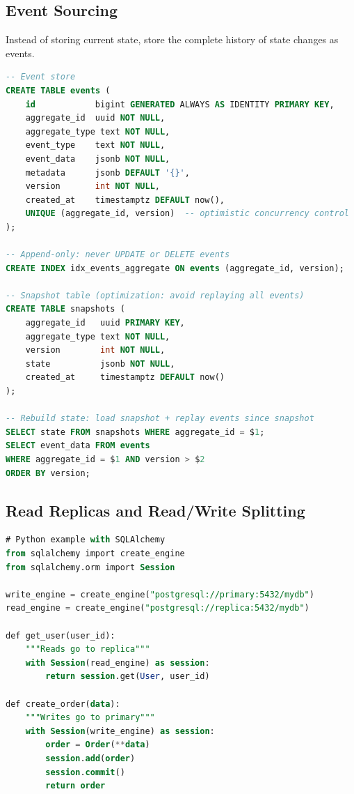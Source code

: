 \documentclass[12pt,a4paper]{article}
\begin{document}
\subsection{Event Sourcing}

Instead of storing current state, store the complete history of state changes as events.

\begin{lstlisting}[language=SQL, caption={Event sourcing in PostgreSQL}]
-- Event store
CREATE TABLE events (
    id            bigint GENERATED ALWAYS AS IDENTITY PRIMARY KEY,
    aggregate_id  uuid NOT NULL,
    aggregate_type text NOT NULL,
    event_type    text NOT NULL,
    event_data    jsonb NOT NULL,
    metadata      jsonb DEFAULT '{}',
    version       int NOT NULL,
    created_at    timestamptz DEFAULT now(),
    UNIQUE (aggregate_id, version)  -- optimistic concurrency control
);

-- Append-only: never UPDATE or DELETE events
CREATE INDEX idx_events_aggregate ON events (aggregate_id, version);

-- Snapshot table (optimization: avoid replaying all events)
CREATE TABLE snapshots (
    aggregate_id   uuid PRIMARY KEY,
    aggregate_type text NOT NULL,
    version        int NOT NULL,
    state          jsonb NOT NULL,
    created_at     timestamptz DEFAULT now()
);

-- Rebuild state: load snapshot + replay events since snapshot
SELECT state FROM snapshots WHERE aggregate_id = $1;
SELECT event_data FROM events
WHERE aggregate_id = $1 AND version > $2
ORDER BY version;
\end{lstlisting}

\subsection{Read Replicas and Read/Write Splitting}

\begin{lstlisting}[language=SQL, caption={Application-level read/write splitting}]
# Python example with SQLAlchemy
from sqlalchemy import create_engine
from sqlalchemy.orm import Session

write_engine = create_engine("postgresql://primary:5432/mydb")
read_engine = create_engine("postgresql://replica:5432/mydb")

def get_user(user_id):
    """Reads go to replica"""
    with Session(read_engine) as session:
        return session.get(User, user_id)

def create_order(data):
    """Writes go to primary"""
    with Session(write_engine) as session:
        order = Order(**data)
        session.add(order)
        session.commit()
        return order
\end{lstlisting}
\end{document}

